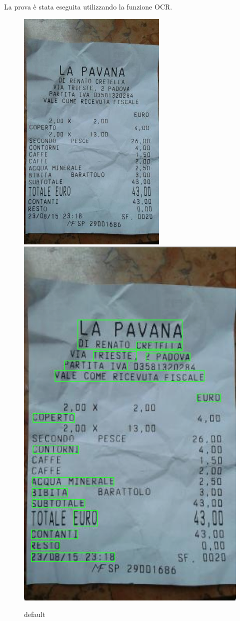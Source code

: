 \documentclass[fleqn,a4paper,11pt]{report}
\begin{document}
La prova è stata eseguita utilizzando la funzione OCR.
\begin{figure}[htbp]
\begin{center}
	\includegraphics[height=.5\textwidth]{img/scontrino.jpg}
  	\hspace*{1in}
	\includegraphics[height=.5\textwidth]{img/ms-ocr.png}
\caption{default}
\label{default}
\end{center}
\end{figure}






%
\end{document}
